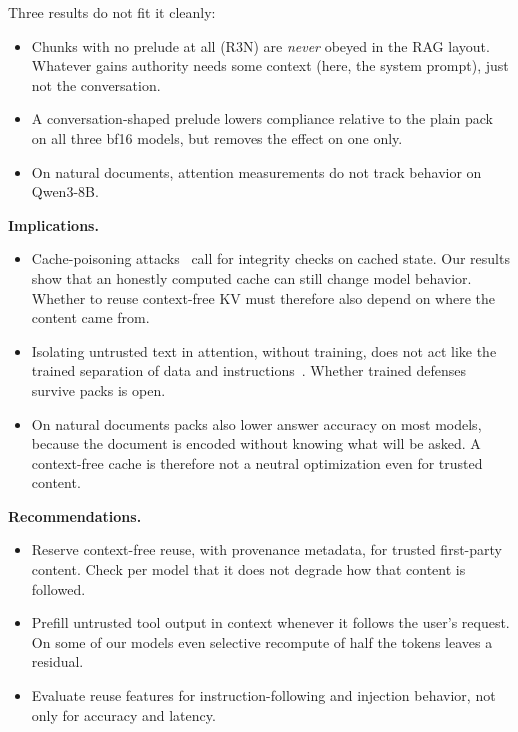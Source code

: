 \documentclass[10pt]{article}
\newcommand{\cond}[1]{\textsf{#1}}
\begin{document}
Three results do not fit it cleanly:
\begin{itemize}
\item Chunks with no prelude at all (\cond{R3N}) are \emph{never} obeyed in the RAG layout. Whatever gains authority needs some
  context (here, the system prompt), just not the conversation.
\item A conversation-shaped prelude lowers compliance relative to the plain pack on all three bf16 models, but removes the effect on
  one only.
\item On natural documents, attention measurements do not track behavior on Qwen3-8B.
\end{itemize}

\textbf{Implications.}
\begin{itemize}
\item Cache-poisoning attacks~\citep{zhang2026hijackkv,zhu2026r2ecap} call for integrity checks on cached state. Our results show
  that an honestly computed cache can still change model behavior. Whether to reuse context-free KV must therefore also depend on
  where the content came from.
\item Isolating untrusted text in attention, without training, does not act like the trained separation of data and
  instructions~\citep{chen2025struq,chen2025secalign,wu2025ise}. Whether trained defenses survive packs is open.
\item On natural documents packs also lower answer accuracy on most models, because the document is encoded without knowing what
  will be asked. A context-free cache is therefore not a neutral optimization even for trusted content.
\end{itemize}

\textbf{Recommendations.}
\begin{itemize}
\item Reserve context-free reuse, with provenance metadata, for trusted first-party content. Check per model that it does not
  degrade how that content is followed.
\item Prefill untrusted tool output in context whenever it follows the user's request. On some of our models even selective
  recompute of half the tokens leaves a residual.
\item Evaluate reuse features for instruction-following and injection behavior, not only for accuracy and latency.
\end{itemize}
\end{document}
